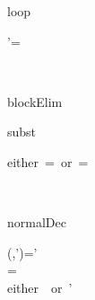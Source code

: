 \begin{RuleFrame}
\begin{MetaRule}{loop}
\begin{consequence}
\ReduceE{
  \ctxVal[ \loopKw\,\e  ]
}{
  \ctxVal[ \e' ]
}
\end{consequence}
\begin{sideCondition}
\e'= \Vd{\Xt{}\x{\Type\IMdf\VoidKw{}}{\e}}{\\\quad\quad\quad }{\loopKw\,\e}
\end{sideCondition}
\end{MetaRule}


\\[6ex]

\begin{MetaRule}{blockElim}
\begin{consequence}
\!\!\!
\end{consequence}
\begin{sideCondition}
\mdf \geq \SMdf
\end{sideCondition}
\end{MetaRule}






\begin{MetaRule}{subst}
\begin{consequence}
\end{consequence}
\begin{sideCondition}
\mbox{either }\val=\atom\mbox{ or }\mdf=\CMdf
\end{sideCondition}
\end{MetaRule}

\\

\begin{MetaRule}{normalDec}
\begin{consequence}
\end{consequence}
\begin{sideCondition}
\class(\ctxVal,\e')=\Path'\\
\dv=\mbox{}
\\
\mbox{either }\ph\neq\emptyset\mbox{ or }\Path'\neq\Path
\end{sideCondition}
\end{MetaRule}



\end{RuleFrame}
